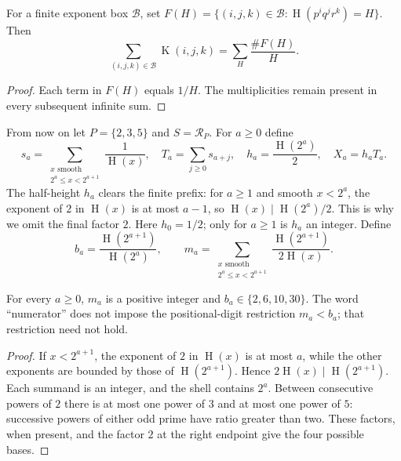 \documentclass[11pt]{article}
\newcommand{\hgt}{\operatorname{H}}
\newcommand{\Kernel}{\operatorname{K}}
\begin{document}
\begin{proposition}\label{res:fibre-prop}
For a finite exponent box $\mathcal B$, set
$F(H)=\{(i,j,k)\in\mathcal B:\hgt(p^iq^jr^k)=H\}$.  Then
\begin{equation}\label{res:fibre}
 \sum_{(i,j,k)\in\mathcal B}\Kernel(i,j,k)=\sum_H\frac{\#F(H)}H.
\end{equation}
\end{proposition}
\begin{proof}
Each term in $F(H)$ equals $1/H$.  The multiplicities remain present in
every subsequent infinite sum.
\end{proof}

From now on let $P=\{2,3,5\}$ and $S=\mathcal R_P$.  For $a\ge0$ define
\[
 s_a=\sum_{\substack{x\text{ smooth}\\2^a\le x<2^{a+1}}}\frac1{\hgt(x)},
 \quad T_a=\sum_{j\ge0}s_{a+j},\quad
 h_a=\frac{\hgt(2^a)}2,\quad X_a=h_aT_a.
\]
The half-height $h_a$ clears the finite prefix: for $a\ge1$ and smooth
$x<2^a$, the exponent of $2$ in $\hgt(x)$ is at most $a-1$, so
$\hgt(x)\mid\hgt(2^a)/2$.  This is why we omit the final factor $2$.
Here $h_0=1/2$; only for $a\ge1$ is $h_a$ an integer.  Define
\begin{equation}\label{eq:actual-digit}
 b_a=\frac{\hgt(2^{a+1})}{\hgt(2^a)},\qquad
 m_a=\sum_{\substack{x\text{ smooth}\\2^a\le x<2^{a+1}}}
       \frac{\hgt(2^{a+1})}{2\hgt(x)}.
\end{equation}

\begin{lemma}
\label{res:dyadic-alphabet}
For every $a\ge0$, $m_a$ is a positive integer and
$b_a\in\{2,6,10,30\}$.  The word ``numerator'' does not impose the
positional-digit restriction $m_a<b_a$; that restriction need not hold.
\end{lemma}
\begin{proof}
If $x<2^{a+1}$, the exponent of $2$ in $\hgt(x)$ is at most $a$, while the
other exponents are bounded by those of $\hgt(2^{a+1})$.  Hence
$2\hgt(x)\mid\hgt(2^{a+1})$.  Each summand is an integer,
and the shell contains $2^a$.  Between consecutive powers of $2$ there is at most one power of $3$
and at most one power of $5$: successive powers of either odd prime have
ratio greater than two.  These factors, when present, and the factor $2$
at the right endpoint give the four possible bases.
\end{proof}
\end{document}
